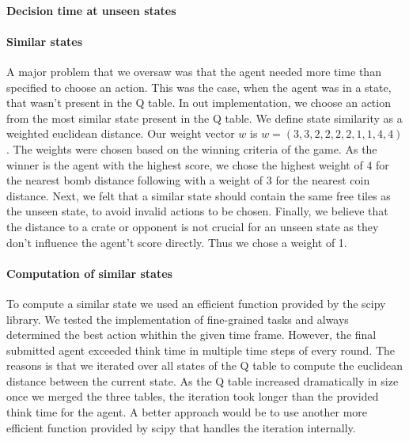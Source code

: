 \documentclass[
	letterpaper, %
	12pt, %
]{CSUniSchoolLabReport}
\begin{document}
\paragraph*{Decision time at unseen states}
\paragraph*{Similar states}
A major problem that we oversaw was that the agent needed more time than specified to choose an action.
This was the case, when the agent was in a state, that wasn't present in the Q table. In out implementation, we
choose an action from the most similar state present in the Q table. We define state similarity as a weighted euclidean
distance. Our weight vector $w$ is $ w= (3, 3, 2, 2, 2, 2, 1, 1, 4, 4)$. The weights were
chosen based on the winning criteria of the game. As the winner is the agent with the highest score,
we chose the highest weight of 4 for the nearest bomb distance following with a weight of 3 for the nearest coin distance.
Next, we felt that a similar state should contain the same free tiles as the unseen state, to avoid invalid actions to be chosen.
Finally, we believe that the distance to a crate or opponent is not crucial for an unseen state as they don't influence the agent't score directly.
Thus we chose a weight of 1.

\paragraph*{Computation of similar states}
To compute a similar state we used an efficient function provided by the scipy library. We
tested the implementation of fine-grained tasks and always determined the best action
whithin the given time frame. However, the final submitted agent exceeded think time in multiple time steps of every round.
The reasons is that we iterated over all states of the Q table to compute the euclidean distance between
the current state. As the Q table increased dramatically in size once we merged the three tables, the iteration took longer than the provided
think time for the agent. A better approach would be to use another more efficient function provided by scipy
that handles the iteration internally.




\end{document}
